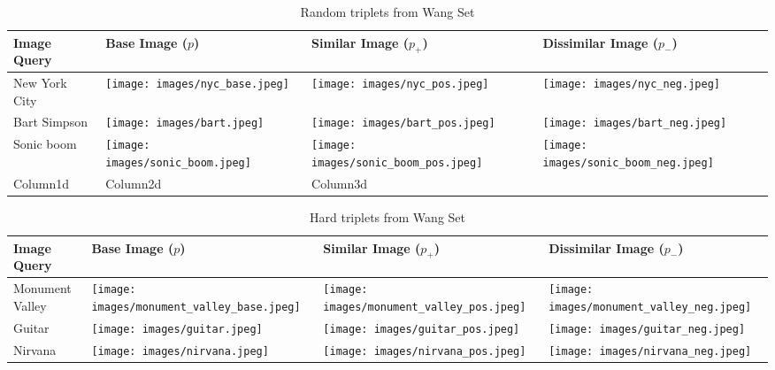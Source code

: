 \begin{table}
	\begin{tabular}{>{\centering\arraybackslash}m{1in} >{\centering\arraybackslash}m{1.4in} >{\centering\arraybackslash}m{1.4in} >{\centering\arraybackslash}m{1.4in}}
		\toprule
		\bfseries Image Query & \bfseries Base Image ($p$) & \bfseries Similar Image ($p_+$) & \bfseries Dissimilar Image ($p_-$) \\
		\midrule
		\centering New York City & \texttt{[image: images/nyc\_base.jpeg]} & \texttt{[image: images/nyc\_pos.jpeg]} & \texttt{[image: images/nyc\_neg.jpeg]}\\
		Bart Simpson & \texttt{[image: images/bart.jpeg]} & \texttt{[image: images/bart\_pos.jpeg]} & \texttt{[image: images/bart\_neg.jpeg]}\\
		Sonic boom & \texttt{[image: images/sonic\_boom.jpeg]} & \texttt{[image: images/sonic\_boom\_pos.jpeg]} & \texttt{[image: images/sonic\_boom\_neg.jpeg]}\\
		Column1d & Column2d & Column3d & \\
		\bottomrule
	\end{tabular}
	\caption{Random triplets from Wang Set}
	\label{table:random_triplets}
\end{table}

\begin{table}
	\begin{tabular}{>{\centering\arraybackslash}m{1in} >{\centering\arraybackslash}m{1.4in} >{\centering\arraybackslash}m{1.4in} >{\centering\arraybackslash}m{1.4in}}
		\toprule
		\bfseries Image Query & \bfseries Base Image ($p$) & \bfseries Similar Image ($p_+$) & \bfseries Dissimilar Image ($p_-$) \\
		\midrule
		\centering Monument Valley & \texttt{[image: images/monument\_valley\_base.jpeg]} & \texttt{[image: images/monument\_valley\_pos.jpeg]} & \texttt{[image: images/monument\_valley\_neg.jpeg]}\\
		Guitar & \texttt{[image: images/guitar.jpeg]} & \texttt{[image: images/guitar\_pos.jpeg]} & \texttt{[image: images/guitar\_neg.jpeg]}\\
		Nirvana & \texttt{[image: images/nirvana.jpeg]} & \texttt{[image: images/nirvana\_pos.jpeg]} & \texttt{[image: images/nirvana\_neg.jpeg]}\\
		\bottomrule
	\end{tabular}
	\caption{Hard triplets from Wang Set}
	\label{table:hard_triplets}
\end{table}

